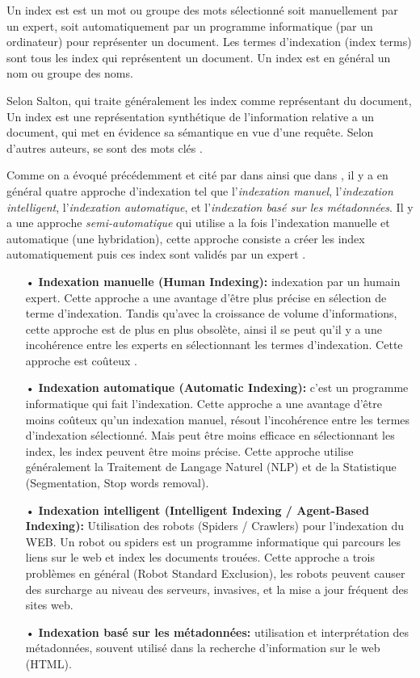 Un index est est un mot ou groupe des mots sélectionné soit manuellement par un expert, soit automatiquement par un programme informatique (par un ordinateur) pour représenter un document. Les termes d'indexation (index terms) sont tous les index qui représentent un document. Un index est en général un nom ou groupe des noms.

Selon Salton, qui traite généralement les index comme représentant du document, Un index est une représentation synthétique de l'information relative a un document, qui met en évidence sa sémantique en vue d'une requête. Selon d'autres auteurs, se sont des mots clés \citep{paradis:tel-00005009}.

Comme on a évoqué précédemment et cité par dans \citep{ir-on-web} ainsi que dans \citep{amelioration-ri-approche-semantique}, il y a en général quatre approche d'indexation tel que l'\textit{indexation manuel}, l'\textit{indexation intelligent}, l’\textit{indexation automatique}, et l'\textit{indexation basé sur les métadonnées}. Il y a une approche \textit{semi-automatique} qui utilise a la fois l'indexation manuelle et automatique (une hybridation), cette approche consiste a créer les index automatiquement puis ces index sont validés par un expert \citep{paradis:tel-00005009}.

\begin{itemize}
    \item[•] \textbf{Indexation manuelle (Human Indexing):} indexation par un humain expert. Cette approche a une avantage d'être plus précise en sélection de terme d'indexation. Tandis qu'avec la croissance de volume d'informations, cette approche est de plus en plus obsolète, ainsi il se peut qu'il y a une incohérence entre les experts en sélectionnant les termes d'indexation. Cette approche est coûteux \citep{evaluation-of-ir-system}.
    \item[•] \textbf{Indexation automatique (Automatic Indexing):} c'est un programme informatique qui fait l'indexation. Cette approche a une avantage d'être moins coûteux qu'un indexation manuel, résout l'incohérence entre les termes d'indexation sélectionné. Mais peut être moins efficace en sélectionnant les index, les index peuvent être moins précise. Cette approche utilise généralement la Traitement de Langage Naturel (NLP) et de la Statistique (Segmentation, Stop words removal).
    \item[•] \textbf{Indexation intelligent (Intelligent Indexing / Agent-Based Indexing):} Utilisation des robots (Spiders / Crawlers) pour l'indexation du WEB. Un robot ou spiders est un programme informatique qui parcours les liens sur le web et index les documents trouées. Cette approche a trois problèmes en général (Robot Standard Exclusion), les robots peuvent causer des surcharge au niveau des serveurs, invasives, et la mise a jour fréquent des sites web.
    \item[•] \textbf{Indexation basé sur les métadonnées:} utilisation et interprétation des métadonnées, souvent utilisé dans la recherche d'information sur le web (HTML).
\end{itemize}

